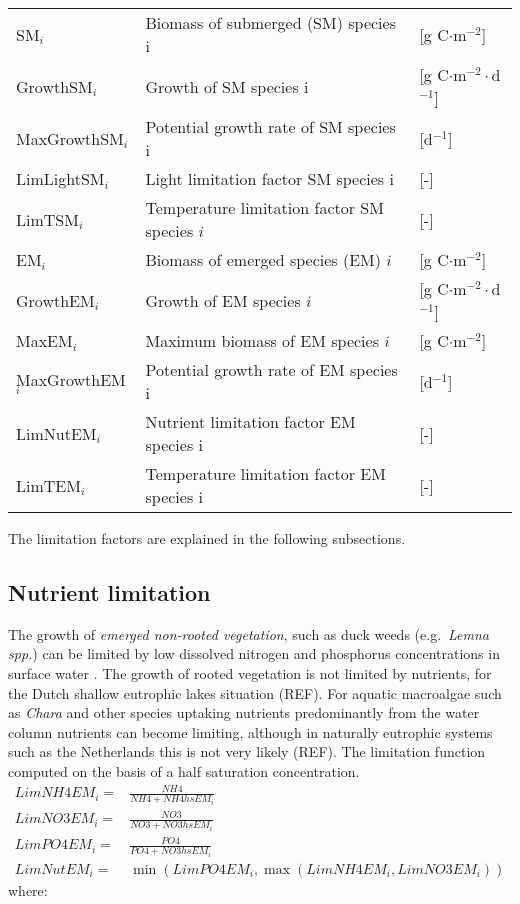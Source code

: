 \begin{tabular}{lll}
SM$_i$           & Biomass of submerged (SM) species i        &[g C$\cdot$m$^{-2}$]          \\
GrowthSM$_i$     & Growth of SM species i                     &[g C$\cdot$m$^{-2}\cdot$d$^{-1}$]  \\
MaxGrowthSM$_i$  & Potential growth rate of SM species i      &[d$^{-1}$]                         \\
LimLightSM$_i$   & Light limitation factor SM species i       &[-]                           \\
LimTSM$_i$       & Temperature limitation factor SM species $i$ &[-]                           \\
EM$_i$           & Biomass of emerged species (EM) $i$          &[g C$\cdot$m$^{-2}$]          \\
GrowthEM$_i$     & Growth of EM species $i$                     &[g C$\cdot$m$^{-2}\cdot$d$^{-1}$]  \\
MaxEM$_i$        & Maximum biomass of EM species $i$            &[g C$\cdot$m$^{-2}$]          \\
MaxGrowthEM$_i$  & Potential growth rate of EM species i      &[d$^{-1}$]                         \\
LimNutEM$_i$     & Nutrient limitation factor EM species i    &[-]                           \\
LimTEM$_i$       & Temperature limitation factor EM species i &[-]                           \\
\end{tabular}

The limitation factors are explained in the following subsections.

\subsection{Nutrient limitation}
The growth of \emph{emerged non-rooted vegetation}, such as duck weeds (e.g.\ \emph{Lemna spp.}) can be limited by
low dissolved nitrogen and phosphorus concentrations in surface water \citep{StowaKrooslagen}. The growth of
rooted vegetation is not limited by nutrients, for the Dutch shallow eutrophic lakes situation (REF). For
aquatic macroalgae such as \emph{Chara} and other species uptaking nutrients predominantly from the water column
nutrients can become limiting, although in naturally eutrophic systems such as the Netherlands this is not
very likely (REF). The limitation function computed on the basis of a half saturation concentration.
%
\begin{align}
             LimNH4EM_i =& \frac{NH4}{NH4 + NH4hsEM_i} \\
\nonumber    LimNO3EM_i =& \frac{NO3}{NO3 + NO3hsEM_i} \\
\nonumber    LimPO4EM_i =& \frac{PO4}{PO4 + NO3hsEM_i} \\
\nonumber    LimNutEM_i =& \min( LimPO4EM_i, \max( LimNH4EM_i, LimNO3EM_i) )
\end{align}
%
where:

